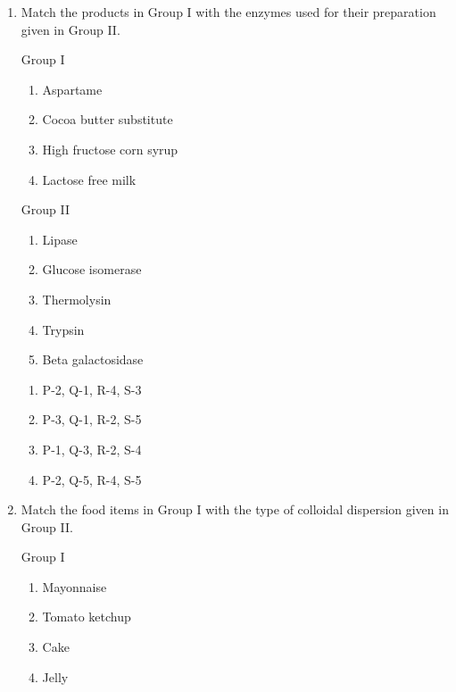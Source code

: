 \documentclass[journal,12pt,onecolumn]{IEEEtran}
\theoremstyle{remark}
\begin{document}
\begin{enumerate}
\begin{enumerate}
    \item P-2, Q-3, R-4, S-1
    \item P-2, Q-4, R-3, S-1
    \item P-3, Q-1, R-2, S-4
    \item P-4, Q-3, R-1, S-2
\end{enumerate}

\item Match the products in Group I with the enzymes used for their preparation given in Group II.

\begin{multicols}{2}
Group I
\begin{enumerate}[label=\Alph*.]
    \item Aspartame
    \item Cocoa butter substitute
    \item High fructose corn syrup
    \item Lactose free milk
\end{enumerate}

Group II
\begin{enumerate}[label=\arabic*.]
    \item Lipase
    \item Glucose isomerase
    \item Thermolysin
    \item Trypsin
    \item Beta galactosidase
\end{enumerate}
\end{multicols}

\begin{enumerate}
    \item P-2, Q-1, R-4, S-3
    \item P-3, Q-1, R-2, S-5
    \item P-1, Q-3, R-2, S-4
    \item P-2, Q-5, R-4, S-5
\end{enumerate}

\item Match the food items in Group I with the type of colloidal dispersion given in Group II.

\begin{multicols}{2}
Group I
\begin{enumerate}[label=\Alph*.]
    \item Mayonnaise
    \item Tomato ketchup
    \item Cake
    \item Jelly
\end{enumerate}


\end{multicols}
\end{enumerate}
\end{document}
